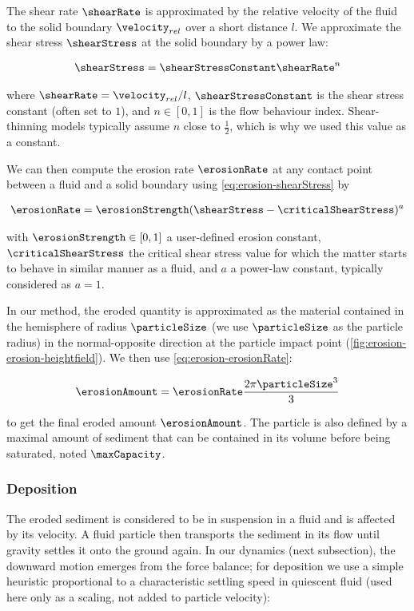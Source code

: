 The shear rate $\shearRate$ is approximated by the relative velocity of the fluid to the solid boundary $\velocity_{rel}$ over a short distance $l$.
We approximate the shear stress $\shearStress$ at the solid boundary by a power law:

\begin{align}
    \label{eq:erosion-shearStress}
    \shearStress = \shearStressConstant \shearRate^n
\end{align}

where $\shearRate = \velocity_{rel}/l$, $\shearStressConstant$ is the shear stress constant (often set to $1$), and $n \in [0,1]$ is the flow behaviour index. Shear-thinning models typically assume $n$ close to $\frac{1}{2}$, which is why we used this value as a constant.  

We can then compute the erosion rate $\erosionRate$ at any contact point between a fluid and a solid boundary using \cref{eq:erosion-shearStress} by 

\begin{align}
    \label{eq:erosion-erosionRate}
    \erosionRate = \erosionStrength (\shearStress - \criticalShearStress)^a
\end{align}

with $\erosionStrength \in [0,1]$ a user-defined erosion constant, $\criticalShearStress$ the critical shear stress value for which the matter starts to behave in similar manner as a fluid, and $a$ a power-law constant, typically considered as $a = 1$. 

In our method, the eroded quantity is approximated as the material contained in the hemisphere of radius $\particleSize$ (we use $\particleSize$ as the particle radius) in the normal-opposite direction at the particle impact point (\cref{fig:erosion-erosion-heightfield}). We then use \cref{eq:erosion-erosionRate}: 

\begin{align}
    \label{eq:erosion-erosionAmount} 
    \erosionAmount = \erosionRate \frac{ 2 \pi \particleSize^3 }{ 3 }
\end{align}

to get the final eroded amount $\erosionAmount$. The particle is also defined by a maximal amount of sediment that can be contained in its volume before being saturated, noted $\maxCapacity$.

\subsubsection{Deposition}
The eroded sediment is considered to be in suspension in a fluid and is affected by its velocity. A fluid particle then transports the sediment in its flow until gravity settles it onto the ground again. In our dynamics (next subsection), the downward motion emerges from the force balance; for deposition we use a simple heuristic proportional to a characteristic settling speed in quiescent fluid (used here only as a scaling, not added to particle velocity):

